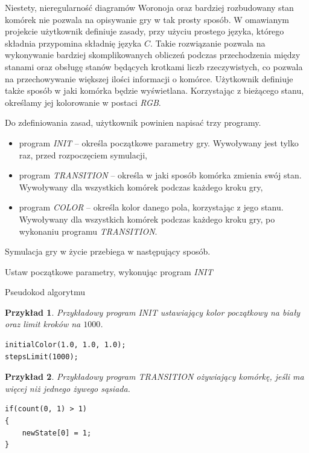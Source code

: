 \documentclass[declaration,shortabstract, inz]{iithesis}
\theoremstyle{definition} \newtheorem{definition}{Definicja}[]
\theoremstyle{plain} \newtheorem{remark}[definition]{Obserwacja}
\theoremstyle{plain} \newtheorem{theorem}[definition]{Twierdzenie}
\theoremstyle{plain} \newtheorem{example}{Przykład}[definition]
\theoremstyle{plain} \newtheorem{lemma}[definition]{Lemat}
\begin{document}
Niestety, nieregularność diagramów Woronoja oraz bardziej rozbudowany stan komórek nie pozwala na opisywanie gry w tak prosty sposób. W omawianym projekcie użytkownik definiuje zasady, przy użyciu prostego języka, którego składnia przypomina składnię języka $C$. Takie rozwiązanie pozwala na wykonywanie bardziej skomplikowanych obliczeń podczas przechodzenia między stanami oraz obsługę stanów będących krotkami liczb rzeczywistych, co pozwala na przechowywanie większej ilości informacji o komórce. Użytkownik definiuje także sposób w jaki komórka będzie wyświetlana. Korzystając z bieżącego stanu, określamy jej kolorowanie w postaci \textit{RGB}.

Do zdefiniowania zasad, użytkownik powinien napisać trzy programy. 
\begin{itemize}
\item program \textit{INIT} -- określa początkowe parametry gry. Wywoływany jest tylko raz, przed rozpoczęciem symulacji,
\item program \textit{TRANSITION} -- określa w jaki sposób komórka zmienia swój stan. Wywoływany dla wszystkich komórek podczas każdego kroku gry,
\item program \textit{COLOR} -- określa kolor danego pola, korzystając z jego stanu. Wywoływany dla wszystkich komórek podczas każdego kroku gry, po wykonaniu programu \textit{TRANSITION}.
\end{itemize}

Symulacja gry w życie przebiega w następujący sposób.

\begin{algorithm}[H]
\SetAlgoLined
	Ustaw początkowe parametry, wykonując program \textit{INIT}\\
 \caption{Pseudokod algorytmu}
\end{algorithm}


\begin{example}
Przykładowy program \textit{INIT} ustawiający kolor początkowy na biały oraz limit kroków na $1000$.
\begin{center}
\begin{lstlisting}
initialColor(1.0, 1.0, 1.0);
stepsLimit(1000);
\end{lstlisting}
\end{center}
\end{example}

\begin{example}
Przykładowy program \textit{TRANSITION} ożywiający komórkę, jeśli ma więcej niż jednego żywego sąsiada.
\begin{center}
\begin{lstlisting}
if(count(0, 1) > 1)
{
	newState[0] = 1;
}
\end{lstlisting}
\end{center}
\end{example}
\end{document}
